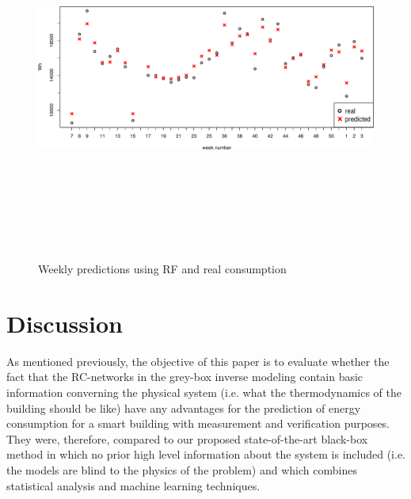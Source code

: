 \documentclass[10pt, conference, compsocconf]{IEEEtran}
\begin{document}
\begin{figure}[t!]\label{fig:weekly}%
\centering
\centerline{\includegraphics[width=12cm,height=12cm,keepaspectratio]{./pics/weekly.pdf}}
\caption{Weekly predictions using RF and real consumption}\vspace*{-6pt}
  \label{fig:weekly}
\end{figure}

\section{Discussion}

As mentioned previously, the objective of this paper is to evaluate whether the fact that the RC-networks in the grey-box inverse modeling contain basic information converning the physical system (i.e. what the thermodynamics of the building should be like) have any advantages for the prediction of energy consumption for a smart building with measurement and verification purposes. They were, therefore, compared to our proposed state-of-the-art black-box method in which no prior high level information about the system is included (i.e. the models are blind to the physics of the problem) and which combines statistical analysis and machine learning techniques. %
\end{document}
